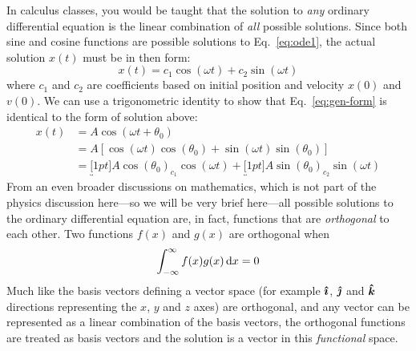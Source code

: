 \begin{remark}
  In calculus classes, you would be taught that the solution to
  \emph{any} ordinary differential equation is the linear combination of
  \emph{all} possible solutions. Since both sine and cosine functions are
  possible solutions to Eq.~\ref{eq:ode1}, the actual solution $x(t)$ must be
  in then form:
  \begin{equation*}
    x(t)=c_1\cos(\omega t)+c_2\sin(\omega t)
  \end{equation*}
  where $c_1$ and $c_2$ are coefficients based on initial position and velocity
  $x(0)$ and $v(0)$. We can use a trigonometric identity to show that
  Eq.~\ref{eq:gen-form} is identical to the form of solution above:
  \begin{align*}
    x(t)&=A\cos(\omega t+\theta_0)\\
    &=A\left[\cos(\omega t)\cos(\theta_0)+\sin(\omega t)\sin(\theta_0)\right]\\
    &=\underbracket[1pt]{A\cos(\theta_0)}_{c_1}\cos(\omega t)
    +\underbracket[1pt]{A\sin(\theta_0)}_{c_2}\sin(\omega t)
  \end{align*}
  From an even broader discussions on mathematics, which is not part of the
  physics discussion here---so we will be very brief here---all possible
  solutions to the ordinary differential equation are, in fact, functions that
  are \emph{orthogonal} to each other. Two functions $f(x)$ and $g(x)$ are
  orthogonal when
  \begin{equation*}
    \int_{-\infty}^\infty f(x)g(x)\dl x=0 
  \end{equation*}
  Much like the basis vectors defining a vector space (for example $\bm{\hat\imath}$,
  $\bm{\hat\jmath}$ and $\bm{\hat k}$ directions representing the $x$, $y$ and $z$ axes) are
  orthogonal, and any vector can be represented as a linear combination of the
  basis vectors, the orthogonal functions are treated as basis vectors and the
  solution is a vector in this \emph{functional} space.
\end{remark}

